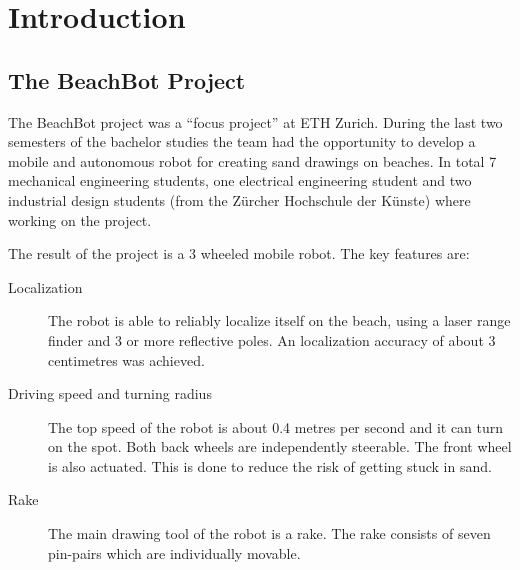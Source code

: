 \chapter{Introduction}
\section{The BeachBot Project}
The BeachBot project was a \enquote{focus project} at ETH Zurich. During the last two semesters of the bachelor studies the team had the opportunity to develop a mobile and autonomous robot for creating sand drawings on beaches. In total 7 mechanical engineering students, one electrical engineering student and two industrial design students (from the Zürcher Hochschule der Künste) where working on the project. 

The result of the project is a 3 wheeled mobile robot. The key features are:
\begin{description}
\item[Localization] The robot is able to reliably localize itself on the beach, using a laser range finder and 3 or more reflective poles. An localization accuracy of about 3 centimetres was achieved.
\item[Driving speed and turning radius] The top speed of the robot is about 0.4 metres per second and it can turn on the spot. Both back wheels are independently steerable. The front wheel is also actuated. This is done to reduce the risk of getting stuck in sand.
\item[Rake] The main drawing tool of the robot is a rake. The rake consists of seven pin-pairs which are individually movable.
\end{description}

